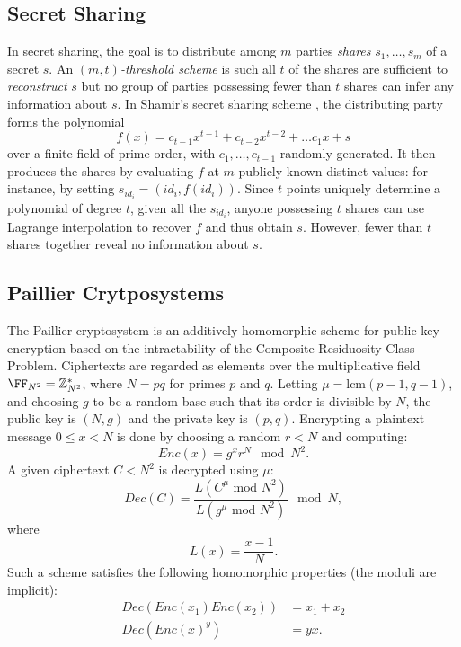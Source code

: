 \subsection{Secret Sharing}

In secret sharing, the goal is to distribute among $m$ parties \emph{shares
}$s_{1},\ldots,s_{m}$ of a secret $s$. An \emph{$(m,t)$-threshold
scheme} is such all $t$ of the shares are sufficient to \emph{reconstruct
}$s$ but no group of parties possessing fewer than $t$ shares can
infer any information about $s$. In Shamir's secret sharing scheme
\cite{Shamir}, the distributing party forms the polynomial 
\[
f(x)=c_{t-1}x^{t-1}+c_{t-2}x^{t-2}+\ldots c_{1}x+s
\]
over a finite field of prime order, with $c_{1},\ldots, c_{t-1}$ randomly
generated. It then produces the shares by evaluating $f$ at $m$
publicly-known distinct values: for instance, by setting $s_{id_i}=(id_i,f(id_i))$.
Since $t$ points uniquely determine a polynomial of degree $t$,
given all the $s_{id_i}$, anyone possessing $t$ shares can use Lagrange
interpolation to recover $f$ and thus obtain $s$. However, fewer
than $t$ shares together reveal no information about $s$.

\subsection{Paillier Crytposystems}

The Paillier cryptosystem \cite{Paillier} is an additively homomorphic
scheme for public key encryption based on the intractability of the
Composite Residuosity Class Problem. Ciphertexts are regarded as elements
over the multiplicative field $\FF_{N^2} = \mathbb{Z}_{N^{2}}^{*}$, where $N=pq$
for primes $p$ and $q$. Letting $\mu=\text{lcm}(p-1,q-1)$,
and choosing $g$ to be a random base such that its order is divisible
by $N$, the public key is $(N,g)$ and the private key is $(p,q)$.
Encrypting a plaintext message $0\leq x<N$ is done by choosing a random
$r<N$ and computing: 
\[
Enc(x)=g^{x}r^{N}\mod N^{2}.
\]
A given ciphertext $C<N^{2}$ is decrypted using $\mu$: 
\[
Dec(C)=\frac{L(C^{\mu}\text{ mod }N^{2})}{L(g^{\mu}\text{ mod }N^{2})}\mod N,
\]
where 
\[
L(x)=\frac{x-1}{N}.
\]
Such a scheme satisfies the following homomorphic properties (the
moduli are implicit): 
\begin{align*}
Dec(Enc(x_{1})Enc(x_{2})) & =x_{1}+x_{2}\\
Dec(Enc(x)^{y}) & =yx.
\end{align*}


